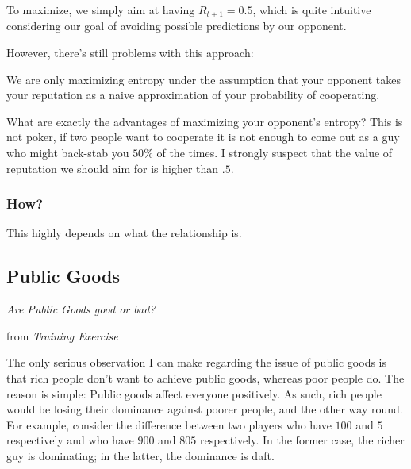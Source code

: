 \documentclass[10pt,fleqn]{article}
\begin{document}
To maximize, we simply aim at having $R_{t+1} = 0.5$, which is quite intuitive
considering our goal of avoiding possible predictions by our opponent.

However, there's still problems with this approach:
\begin{inlist}
  \item We are only maximizing entropy under the assumption that your opponent
  takes your reputation as a naive approximation of your probability of
  cooperating.
  \item What are exactly the advantages of maximizing your opponent's entropy?
  This is not poker, if two people want to cooperate it is not enough to come
  out as a guy who might back-stab you $50\%$ of the times. I strongly suspect
  that the value of reputation we should aim for is higher than $.5$.
\end{inlist}

\subsubsection{How?}

This highly depends on what the relationship is.

\subsection{Public Goods}
\emph{Are Public Goods good or bad?}

\begin{quotation}
\end{quotation}
\hfill from \emph{Training Exercise}

The only serious observation I can make regarding the issue of public goods is
that rich people don't want to achieve public goods, whereas poor people do. The
reason is simple: Public goods affect everyone positively. As such, rich people
would be losing their dominance against poorer people, and the other way round.
For example, consider the difference between two players who have $100$ and $5$
respectively and who have $900$ and $805$ respectively. In the former case, the
richer guy is dominating; in the latter, the dominance is daft.
\end{document}
